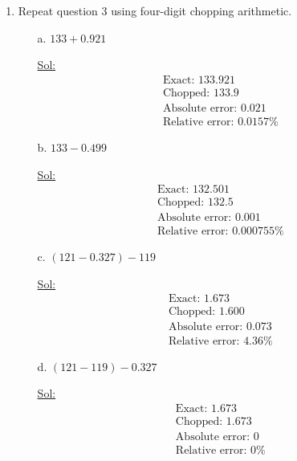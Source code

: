 \begin{enumerate}
\item Repeat question 3 using four-digit chopping arithmetic.
  \begin{itemize}
    \item[a.] \( 133 + 0.921 \)

      \underline{Sol:}\\
      \[
        \begin{array}{l}
          \textrm{Exact: } 133.921 \\
          \textrm{Chopped: } 133.9 \\
          \textrm{Absolute error: } 0.021 \\
          \textrm{Relative error: } 0.0157\%
        \end{array}
      \]
      \bigbreak

    \item[b.] \( 133 - 0.499 \)

      \underline{Sol:}\\
      \[
        \begin{array}{l}
          \textrm{Exact: } 132.501 \\
          \textrm{Chopped: } 132.5 \\
          \textrm{Absolute error: } 0.001 \\
          \textrm{Relative error: } 0.000755\%
        \end{array}
      \]
      \bigbreak

    \item[c.] \( (121 - 0.327) - 119 \)

      \underline{Sol:}\\
      \[
        \begin{array}{l}
          \textrm{Exact: } 1.673 \\
          \textrm{Chopped: } 1.600 \\
          \textrm{Absolute error: } 0.073 \\
          \textrm{Relative error: } 4.36\%
        \end{array}
      \]
      \bigbreak

    \item[d.] \( (121 - 119) - 0.327 \)

      \underline{Sol:}\\
      \[
        \begin{array}{l}
          \textrm{Exact: } 1.673 \\
          \textrm{Chopped: } 1.673 \\
          \textrm{Absolute error: } 0 \\
          \textrm{Relative error: } 0\%
        \end{array}
      \]
      \bigbreak


\end{itemize}
\end{enumerate}

